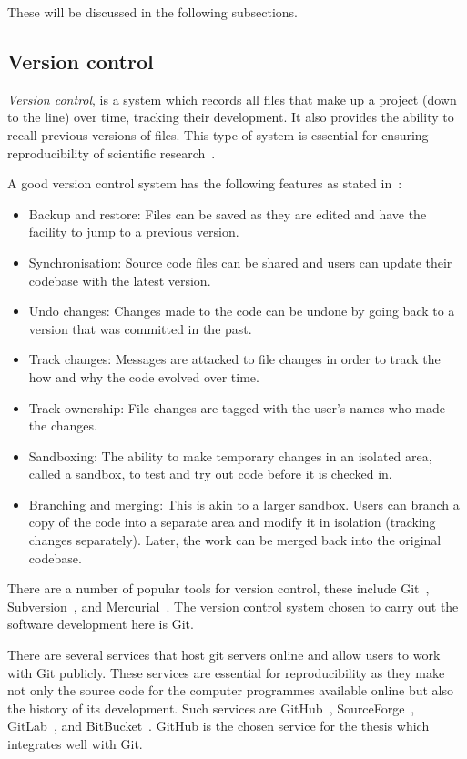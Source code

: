 These will be discussed in the following subsections.

\subsection{Version control}

\textit{Version control}, is a system which records all files that make up a
project (down to the line) over time, tracking their development. It also
provides the ability to recall previous versions of files. This type of system
is essential for ensuring reproducibility of scientific research~\cite{Sandve2013,
Wilson2014}.

A good version control system has the following features as stated in~\cite{Ruparelia2010}:

\begin{itemize}
    \item Backup and restore: Files can be saved as they are edited and have the facility to
    jump to a previous version.
    \item Synchronisation: Source code files can be shared and users can update their
    codebase with the latest version.
    \item Undo changes: Changes made to the code can be undone by going back
    to a version that was committed in the past.
    \item Track changes: Messages are attacked to file changes in order to track the
    how and why the code evolved over time.
    \item Track ownership: File changes are tagged with the user's names who made
    the changes.
    \item Sandboxing: The ability to make temporary changes in an isolated area,
    called a sandbox, to test and try out code before it is checked in.
    \item Branching and merging: This is akin to a larger sandbox. Users can
    branch a copy of the code into a separate area and modify it in
    isolation (tracking changes separately). Later, the work can be merged back
    into the original codebase.
\end{itemize}

There are a number of popular tools for version control, these include Git~\cite{git},
Subversion~\cite{subversion}, and Mercurial~\cite{mercurial}. The version
control system chosen to carry out the software development here is Git.

There are several services that host git servers online and allow users to work
with Git publicly. These services are essential for reproducibility as they make
not only the source code for the computer programmes available online but also
the history of its development. Such services are GitHub~\cite{github},
SourceForge~\cite{sourceforge}, GitLab~\cite{gitlab}, and BitBucket~\cite{bitbucket}.
GitHub is the chosen service for the thesis which integrates well with Git.

